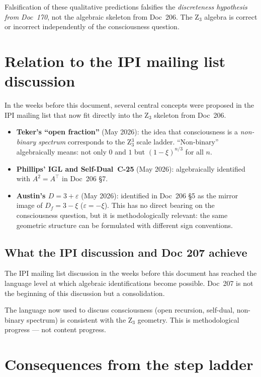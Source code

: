\begin{interpretation}
Falsification of these qualitative predictions falsifies the \emph{discreteness hypothesis from Doc~170}, not the algebraic skeleton from Doc~206. The Z$_3$ algebra is correct or incorrect independently of the consciousness question.
\end{interpretation}

\section{Relation to the IPI mailing list discussion}\label{sec:ipi}

In the weeks before this document, several central concepts were proposed in the IPI mailing list that now fit directly into the Z$_3$ skeleton from Doc~206.

\begin{itemize}
\item \textbf{Teker's ``open fraction''} (May 2026): the idea that consciousness is a \emph{non-binary spectrum} corresponds to the Z$_3^3$ scale ladder. ``Non-binary'' algebraically means: not only $0$ and $1$ but $(1-\xi)^{n/3}$ for all $n$.
\item \textbf{Phillips' IGL and Self-Dual~C-25} (May 2026): algebraically identified with $A^2 = A^\top$ in Doc~206 \S7.
\item \textbf{Austin's $D = 3 + \varepsilon$} (May 2026): identified in Doc~206 \S5 as the mirror image of $D_f = 3 - \xi$ ($\varepsilon = -\xi$). This has no direct bearing on the consciousness question, but it is methodologically relevant: the same geometric structure can be formulated with different sign conventions.
\end{itemize}

\subsection{What the IPI discussion and Doc 207 achieve}

The IPI mailing list discussion in the weeks before this document has reached the language level at which algebraic identifications become possible. Doc~207 is not the beginning of this discussion but a consolidation.

The language now used to discuss consciousness (open recursion, self-dual, non-binary spectrum) is consistent with the Z$_3$ geometry. This is methodological progress --- not content progress.

\section{Consequences from the step ladder}\label{sec:consequences}

